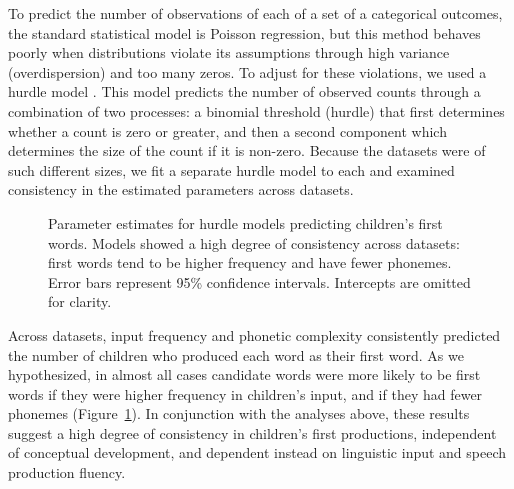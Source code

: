 \documentclass[10pt,letterpaper]{article}
\begin{document}
To predict the number of observations of each of a set of a categorical outcomes, the standard statistical model is Poisson regression, but this method behaves poorly when distributions violate its assumptions through high variance (overdispersion) and too many zeros. To adjust for these violations, we used a hurdle model \cite{mullahy1986}. This model predicts the number of observed counts through a combination of two processes: a binomial threshold (hurdle) that first determines whether a count is zero or greater, and then a second component which determines the size of the count if it is non-zero. Because the datasets were of such different sizes, we fit a separate hurdle model to each and examined consistency in the estimated parameters across datasets.
\begin{figure}[h]
\caption{\label{fig:hurdles} Parameter estimates for hurdle models predicting children's first words. Models showed a high degree of consistency across datasets: first words tend to be higher frequency and have fewer phonemes. Error bars represent 95\% confidence intervals. Intercepts are omitted for clarity.}
\vspace{-1.5em}
\end{figure}


Across datasets, input frequency and phonetic complexity consistently predicted the number of children who produced each word as their first word. As we hypothesized, in almost all cases candidate words were more likely to be first words if they were higher frequency in children's input, and if they had fewer phonemes (Figure~\ref{fig:hurdles}). In conjunction with the analyses above, these results suggest a high degree of consistency in children's first productions, independent of conceptual development, and dependent instead on linguistic input and speech production fluency.
\end{document}
